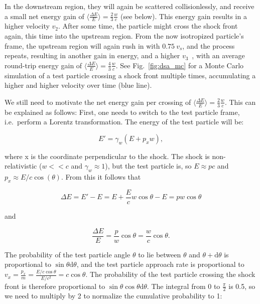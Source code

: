 In the downstream region, they will again be scattered collisionlessly, and receive a small net energy gain of $\big\langle\frac{\Delta E}{E}\big\rangle = \frac{2}{3}\frac{w}{c}$ (see below). This energy gain results in a higher velocity $v_2$. After some time, the particle might cross the shock front again, this time into the upstream region. From the now isotropized particle's frame, the upstream region will again rush in with $0.75~v_s$, and the process repeats, resulting in another gain in energy, and a higher $v_3$~, with an average round-trip energy gain of $\big\langle\frac{\Delta E}{E}\big\rangle = \frac{4}{3}\frac{w}{c}$. See Fig.~\ref{fig:dsa_mc} for a Monte Carlo simulation of a test particle crossing a shock front multiple times, accumulating a higher and higher velocity over time (blue line).

We still need to motivate the net energy gain per crossing of $\big\langle\frac{\Delta E}{E}\big\rangle = \frac{2}{3}\frac{w}{c}$. This can be explained as follows: First, one needs to switch to the test particle frame, i.e.\ perform a Lorentz transformation. The energy of the test particle will be:

\begin{equation}
    E' = \gamma_{w}(E+p_x w),
\end{equation}

where x is the coordinate perpendicular to the shock. The shock is non-relativistic ($w<<c$ and $\gamma_w\approx1$), but the test particle is, so $E\approx pc$ and $p_x \approx E/c \cos(\theta)$. From this it follows that

\begin{equation}
    \Delta E = E' - E = E+\frac{E}{c}w\cos{\theta}-E = pw\cos{\theta}
\end{equation}

and

\begin{equation}
    \frac{\Delta E}{E} = \frac{p}{w}\cos{\theta} = \frac{w}{c}\cos{\theta}.
    \label{eqn:delta_e_over_e}
\end{equation}

The probability of the test particle angle $\theta$ to lie between $\theta$ and $\theta + \text{d}\theta$ is proportional to $\sin{\theta}\text{d}\theta$, and the test particle approach rate is proportional to $v_x = \frac{p_x}{m} = \frac{E/c\cos{\theta}}{E/c^2} = c \cos{\theta}$. The probability of the test particle crossing the shock front is therefore proportional to $\sin{\theta} \cos{\theta} \text{d}\theta$. The integral from 0 to $\frac{\pi}{2}$ is 0.5, so we need to multiply by 2 to normalize the cumulative probability to 1:


